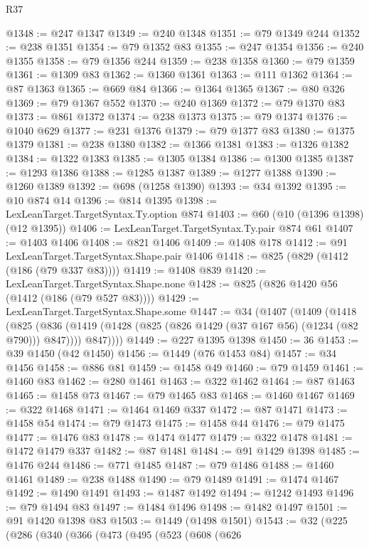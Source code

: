 \begin{lexlean}{R37}
\begin{coremodule}
@1348 := @247 @1347
@1349 := @240 @1348
@1351 := @79 @1349 @244
@1352 := @238 @1351
@1354 := @79 @1352 @83
@1355 := @247 @1354
@1356 := @240 @1355
@1358 := @79 @1356 @244
@1359 := @238 @1358
@1360 := @79 @1359
@1361 := @1309 @83
@1362 := @1360 @1361
@1363 := @111 @1362
@1364 := @87 @1363
@1365 := @669 @84
@1366 := @1364 @1365
@1367 := @80 @326
@1369 := @79 @1367 @552
@1370 := @240 @1369
@1372 := @79 @1370 @83
@1373 := @861 @1372
@1374 := @238 @1373
@1375 := @79 @1374
@1376 := @1040 @629
@1377 := @231 @1376
@1379 := @79 @1377 @83
@1380 := @1375 @1379
@1381 := @238 @1380
@1382 := @1366 @1381
@1383 := @1326 @1382
@1384 := @1322 @1383
@1385 := @1305 @1384
@1386 := @1300 @1385
@1387 := @1293 @1386
@1388 := @1285 @1387
@1389 := @1277 @1388
@1390 := @1260 @1389
@1392 := @698 (@1258 @1390)
@1393 := @34 @1392
@1395 := @10 @874 @14
@1396 := @814 @1395
@1398 := LexLeanTarget.TargetSyntax.Ty.option @874
@1403 := @60 (@10 (@1396 @1398) (@12 @1395))
@1406 := LexLeanTarget.TargetSyntax.Ty.pair @874 @61
@1407 := @1403 @1406
@1408 := @821 @1406
@1409 := @1408 @178
@1412 := @91 LexLeanTarget.TargetSyntax.Shape.pair @1406
@1418 := @825 (@829 (@1412 (@186 (@79 @337 @83))))
@1419 := @1408 @839
@1420 := LexLeanTarget.TargetSyntax.Shape.none
@1428 := @825 (@826 @1420 @56 (@1412 (@186 (@79 @527 @83))))
@1429 := LexLeanTarget.TargetSyntax.Shape.some
@1447 := @34
    (@1407
      (@1409
        (@1418
          (@825
            (@836 (@1419 (@1428 (@825 (@826 @1429 (@37 @167 @56) (@1234 (@82 @790))) @847))))
            @847))))
@1449 := @227 @1395 @1398
@1450 := 36
@1453 := @39 @1450 (@42 @1450)
@1456 := @1449 (@76 @1453 @84)
@1457 := @34 @1456
@1458 := @886 @81
@1459 := @1458 @49
@1460 := @79 @1459
@1461 := @1460 @83
@1462 := @280 @1461
@1463 := @322 @1462
@1464 := @87 @1463
@1465 := @1458 @73
@1467 := @79 @1465 @83
@1468 := @1460 @1467
@1469 := @322 @1468
@1471 := @1464 @1469 @337
@1472 := @87 @1471
@1473 := @1458 @54
@1474 := @79 @1473
@1475 := @1458 @44
@1476 := @79 @1475
@1477 := @1476 @83
@1478 := @1474 @1477
@1479 := @322 @1478
@1481 := @1472 @1479 @337
@1482 := @87 @1481
@1484 := @91 @1429 @1398
@1485 := @1476 @244
@1486 := @771 @1485
@1487 := @79 @1486
@1488 := @1460 @1461
@1489 := @238 @1488
@1490 := @79 @1489
@1491 := @1474 @1467
@1492 := @1490 @1491
@1493 := @1487 @1492
@1494 := @1242 @1493
@1496 := @79 @1494 @83
@1497 := @1484 @1496
@1498 := @1482 @1497
@1501 := @91 @1420 @1398 @83
@1503 := @1449 (@1498 @1501)
@1543 := @32
    (@225
      (@286
        (@340
          (@366
            (@473
              (@495
                (@523
                  (@608
                    (@626

\end{coremodule}
\end{lexlean}
